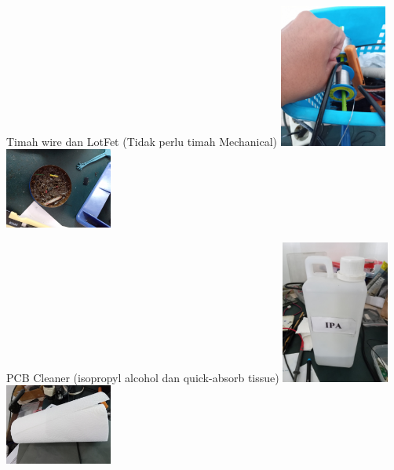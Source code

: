 \documentclass[table,dvipsnames]{beamer}
\begin{document}
	\begin{frame}
		\begin{exampleblock}{Timah wire dan LotFet (Tidak perlu timah Mechanical)}
			\centering
			\includegraphics[width=100pt,angle=-90,origin=c]{images/timah}
			\includegraphics[width=100pt,angle=-90,origin=c]{images/lotfet}
		\end{exampleblock}

		\begin{exampleblock}{PCB Cleaner (isopropyl alcohol dan quick-absorb tissue)}
			\centering
			\includegraphics[width=100pt,angle=-90,origin=c]{images/pcbclean0}
			\includegraphics[width=100pt,angle=-90,origin=c]{images/pcbclean1}
		\end{exampleblock}
	\end{frame}
\end{document}
